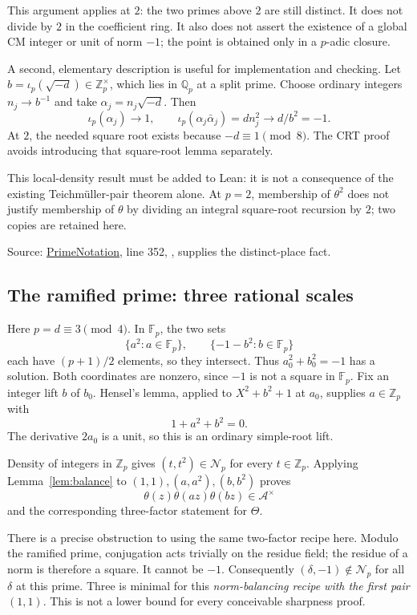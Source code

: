 \documentclass[11pt,letterpaper]{article}
\theoremstyle{remark}\newtheorem{remark}[theorem]{Remark}
\newcommand{\Qp}{\mathbb Q_p}
\newcommand{\Zp}{\mathbb Z_p}
\newcommand{\Fp}{\mathbb F_p}
\newcommand{\A}{\mathcal A}
\newcommand{\Np}{\mathcal N_p}
\newcommand{\Src}[2]{\href{https://github.com/VladimirReshetnikov/ProveIt/blob/89d12dd40424f1217fd818d84877b3da52396a3b/Analysis/GeneralizedRiemannHypothesis/Lean/grh/src/#1}{#2}}
\newcommand{\decl}[1]{\textnormal{\small\texttt{\detokenize{#1}}}}
\newcommand{\source}[1]{\par{\small\color{quiet}\textsf{Source:} #1}\par}
\begin{document}
This argument applies at $2$: the two primes above $2$ are still distinct.
It does not divide by $2$ in the coefficient ring. It also does not
assert the existence of a global CM integer or unit of norm $-1$;
the point is obtained only in a $p$-adic closure.

A second, elementary description is useful for implementation and checking.
Let $b=\iota_p(\sqrt{-d})\in\Zp^\times$, which lies in $\Qp$ at a
split prime. Choose ordinary integers $n_j\to b^{-1}$ and take
$\alpha_j=n_j\sqrt{-d}$. Then
\[
 \iota_p(\alpha_j)\to1,\qquad
 \iota_p(\alpha_j\bar\alpha_j)=d n_j^2\to d/b^2=-1.
\]
At $2$, the needed square root exists because $-d\equiv1\pmod8$.
The CRT proof avoids introducing that square-root lemma separately.

This local-density result must be added to Lean: it is not a consequence
of the existing Teichm\"uller-pair theorem alone. At $p=2$, membership
of $\theta^2$ does not justify membership of $\theta$ by dividing an
integral square-root recursion by $2$; two copies are retained here.
\source{\Src{Lib/CM/FormalGroup/PrimeNotation.lean}{PrimeNotation}, line 352,
\decl{QuadField.star_ne_of_chiK_eq_one}, supplies the distinct-place fact.}

\subsection{The ramified prime: three rational scales}

Here $p=d\equiv3\pmod4$. In $\Fp$, the two sets
\[
 \{a^2:a\in\Fp\},\qquad\{-1-b^2:b\in\Fp\}
\]
each have $(p+1)/2$ elements, so they intersect. Thus
$a_0^2+b_0^2=-1$ has a solution. Both coordinates are nonzero, since
$-1$ is not a square in $\Fp$. Fix an integer lift $b$ of $b_0$.
Hensel's lemma, applied to $X^2+b^2+1$ at $a_0$, supplies
$a\in\Zp$ with
\begin{equation}
 1+a^2+b^2=0.
 \label{eq:ramified}
\end{equation}
The derivative $2a_0$ is a unit, so this is an ordinary simple-root lift.

Density of integers in $\Zp$ gives $(t,t^2)\in\Np$ for every
$t\in\Zp$. Applying Lemma~\ref{lem:balance} to
$(1,1),(a,a^2),(b,b^2)$ proves
\[
 \theta(z)\theta(az)\theta(bz)\in\A^\times
\]
and the corresponding three-factor statement for $\Theta$.

There is a precise obstruction to using the same two-factor recipe here.
Modulo the ramified prime, conjugation acts trivially on the residue field;
the residue of a norm is therefore a square. It cannot be $-1$.
Consequently $(\delta,-1)\notin\Np$ for all $\delta$ at this prime.
Three is minimal for this \emph{norm-balancing recipe with the first pair
$(1,1)$}. This is not a lower bound for every conceivable sharpness proof.
\end{document}
